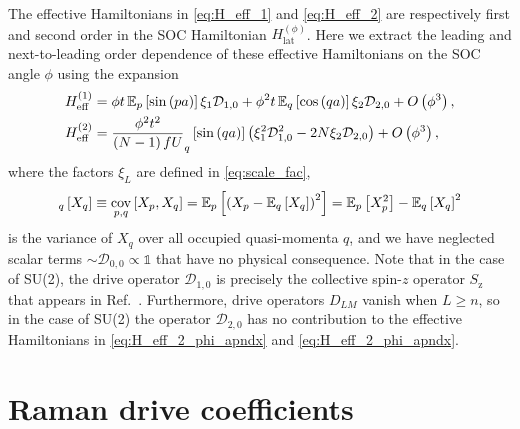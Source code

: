 \documentclass[nofootinbib,notitlepage,11pt]{revtex4-2}
\renewcommand{\t}{\text} %
\newcommand{\f}[2]{\dfrac{#1}{#2}} %
\newcommand{\p}[1]{\left(#1\right)} %
\renewcommand{\sp}[1]{\left[#1\right]} %
\newcommand{\1}{\mathds{1}}
\newcommand{\z}{\text{z}}
\newcommand{\D}{\mathcal{D}}
\newcommand{\EE}{\mathbb{E}}
\DeclareMathOperator{\cov}{cov}
\let\var\relax
\DeclareMathOperator{\var}{var}
\begin{document}
The effective Hamiltonians in \eqref{eq:H_eff_1} and
\eqref{eq:H_eff_2} are respectively first and second order in the SOC
Hamiltonian $H_{\t{lat}}^{(\phi)}$.  Here we extract the leading and
next-to-leading order dependence of these effective Hamiltonians on
the SOC angle $\phi$ using the expansion
\begin{align}
  H_{\t{eff}}^{(1)}
  &= \phi t \, \EE_p\sp{\sin\p{pa}} \xi_1 \D_{1,0}
  + \phi^2 t \, \EE_q\sp{\cos\p{qa}} \xi_2 \D_{2,0}
  + O\p{\phi^3},
  \label{eq:H_eff_1_phi_apndx} \\
  H_{\t{eff}}^{(2)}
  &= \f{\phi^2 t^2}{\p{N-1}fU} \var_q\sp{\sin\p{qa}}
  \p{\xi_1^2 \D_{1,0}^2 - 2 N \xi_2 \D_{2,0}}
  + O\p{\phi^3},
  \label{eq:H_eff_2_phi_apndx}
\end{align}
where the factors $\xi_L$ are defined in \eqref{eq:scale_fac},
\begin{align}
  \var_q\sp{X_q} \equiv \cov_{p,q}\sp{X_p,X_q}
  = \EE_p\sp{\p{X_p-\EE_q\sp{X_q}}^2}
  = \EE_p\sp{X_p^2} - \EE_q\sp{X_q}^2
\end{align}
is the variance of $X_q$ over all occupied quasi-momenta $q$, and we
have neglected scalar terms $\sim\D_{0,0}\propto\1$ that have no
physical consequence.  Note that in the case of SU(2), the drive
operator $\D_{1,0}$ is precisely the collective spin-$z$ operator
$S_\z$ that appears in Ref.~\cite{he2019engineering}.  Furthermore,
drive operators $D_{LM}$ vanish when $L\ge n$, so in the case of SU(2)
the operator $\D_{2,0}$ has no contribution to the effective
Hamiltonians in \eqref{eq:H_eff_2_phi_apndx} and
\eqref{eq:H_eff_2_phi_apndx}.

\section{Raman drive coefficients}
\label{sec:drive_raman_coeff}
\end{document}
